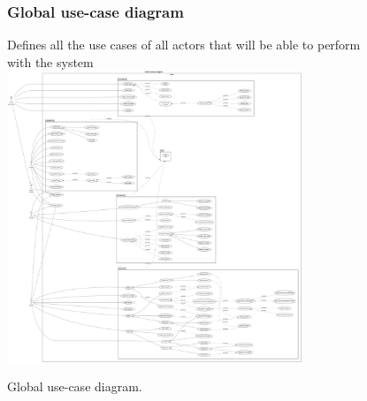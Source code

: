 \documentclass[]{uc2pfecaneva}
\begin{document}
    \begin{figure}
        \subsubsection{Global use-case diagram}
        \centering
        Defines all the use cases of all actors that will be able to perform with the system
        \includegraphics[width=250pt]{images/GUCD}
        \caption{Global use-case diagram.}
    \end{figure}
    \clearpage
\end{document}
